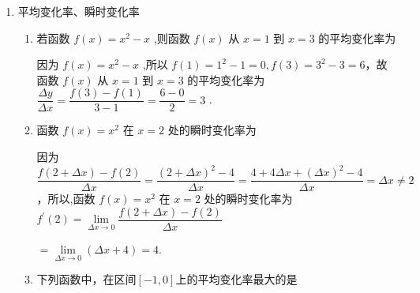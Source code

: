 \begin{enumerate}
\begin{enumerate}
        \item 如果说某物体做直线运动的时间与距离满足 $s\left( t\right)  = 2{\left( 1 - t\right) }^{2}$ , 则其在 $t = {0.5}$ 时的瞬时速度为

        \begin{jieda}
            根据导数的定义可得,在 $t = {0.5}$ 时的瞬时速度为${s}^{\prime }\left( t\right)  = \mathop{\lim }\limits_{{{\Delta t} \rightarrow  0 }}\dfrac{s\left( {{0.5} + {\Delta t}}\right)  - s\left( {0.5}\right) }{\Delta t} = \mathop{\lim }\limits_{{{\Delta t} \rightarrow  0 }}\dfrac{2{\left( 1 - {0.5} - \Delta t\right) }^{2} - 2{\left( 1 - {0.5}\right) }^{2}}{\Delta t} =  - 2$
        \end{jieda}
    \end{enumerate}
    \item 平均变化率、瞬时变化率
    \begin{enumerate}
        \item 若函数 $f\left( x\right)  = {x}^{2} - x$ ,则函数 $f\left( x\right)$ 从 $x = 1$ 到 $x = 3$ 的平均变化率为
        \begin{jieda}
            因为 $f\left( x\right)  = {x}^{2} - x$ ,所以 $f\left( 1\right)  = {1}^{2} - 1 = 0,f\left( 3\right)  = {3}^{2} - 3 = 6$，故函数 $f\left( x\right)$ 从 $x = 1$ 到 $x = 3$ 的平均变化率为 $\dfrac{\Delta y}{\Delta x} = \dfrac{f\left( 3\right)  - f\left( 1\right) }{3 - 1} = \dfrac{6 - 0}{2} = 3$ .
        \end{jieda}
        
        \item 函数 $f\left( x\right)  = {x}^{2}$ 在 $x = 2$ 处的瞬时变化率为
        \begin{jieda}
            因为 $\dfrac{f\left( {2 + {\Delta x}}\right)  - f\left( 2\right) }{\Delta x} = \dfrac{{\left( 2 + \Delta x\right) }^{2} - 4}{\Delta x} = \dfrac{4 + {4\Delta x} + {\left( \Delta x\right) }^{2} - 4}{\Delta x} = {\Delta x} \neq  2$，所以,函数 $f\left( x\right)  = {x}^{2}$ 在 $x = 2$ 处的瞬时变化率为 ${f}^{\prime }\left( 2\right)  = \mathop{\lim }\limits_{{{\Delta x} \rightarrow  0 }}\dfrac{f\left( {2 + {\Delta x}}\right)  - f\left( 2\right) }{\Delta x}$
            
            $= \mathop{\lim }\limits_{{{\Delta x} \rightarrow  0 }}\left( {{\Delta x} + 4}\right)  = 4.$
        \end{jieda}
        
        \item 下列函数中，在区间$[-1,0]$上的平均变化率最大的是
        

\end{enumerate}
\end{enumerate}
